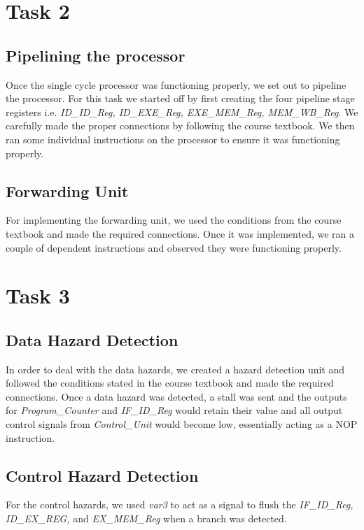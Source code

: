 \documentclass[12pt]{article}
\begin{document}
\section{Task 2}
    \subsection{Pipelining the processor}

    Once the single cycle processor was functioning properly, we set out to pipeline the processor. For this task we started off by first creating the four pipeline stage registers i.e. \textit{ID\_ID\_Reg, ID\_EXE\_Reg, EXE\_MEM\_Reg, MEM\_WB\_Reg}. We carefully made the proper connections by following the course textbook. We then ran some individual instructions on the processor to ensure it was functioning properly.
    
\newpage

\subsection{Forwarding Unit}

    For implementing the forwarding unit, we used the conditions from the course textbook and made the required connections. Once it was implemented, we ran a couple of dependent instructions and observed they were functioning properly.

\section{Task 3}
    \subsection{Data Hazard Detection}
        In order to deal with the data hazards, we created a hazard detection unit and followed the conditions stated in the course textbook and made the required connections. Once a data hazard was detected, a stall was sent and the outputs for \textit{Program\_Counter} and \textit{IF\_ID\_Reg} would retain their value and all output control signals from \textit{Control\_Unit} would become low, essentially acting as a NOP instruction.

    \subsection{Control Hazard Detection}
        For the control hazards, we used \textit{var3} to act as a signal to flush the \textit{IF\_ID\_Reg, ID\_EX\_REG,} and \textit{EX\_MEM\_Reg} when a branch was detected.
\end{document}
